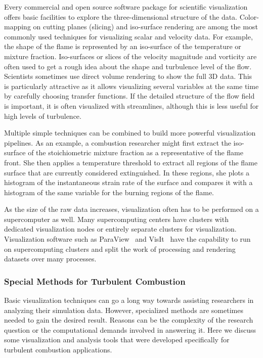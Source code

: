 %
Every commercial and open source software package for scientific visualization
offers basic facilities to explore the three-dimensional structure of the data.
%
Color-mapping on cutting planes (slicing) and iso-surface rendering are among
the most commonly used techniques for visualizing scalar and velocity data.
%
For example, the shape of the flame is represented by an iso-surface of the
temperature or mixture fraction.
%
Iso-surfaces or slices of the velocity magnitude and vorticity are often used to
get a rough idea about the shape and turbulence level of the flow.
%
Scientists sometimes use direct volume rendering to show the full \ac{3D} data.
%
This is particularly attractive as it allows visualizing several variables at
the same time by carefully choosing transfer functions.
%
If the detailed structure of the flow field is important, it is often visualized
with streamlines, although this is less useful for high levels of turbulence.
%

%
Multiple simple techniques can be combined to build more powerful visualization
pipelines.
%
As an example, a combustion researcher might first extract the iso-surface of
the stoichiometric mixture fraction as a representative of the flame front.
%
She then applies a temperature threshold to extract all regions of the flame
surface that are currently considered extinguished.
%
In these regions, she plots a histogram of the instantaneous strain rate of the
surface and compares it with a histogram of the same variable for the burning
regions of the flame.
%

%
As the size of the raw data increases, visualization often has to be performed
on a supercomputer as well.
%
Many supercomputing centers have clusters with dedicated visualization nodes or
entirely separate clusters for visualization.
%
Visualization software such as ParaView~\cite{Ahrens2005} and
VisIt~\cite{HPV:VisIt} have the capability to run on supercomputing clusters
and split the work of processing and rendering datasets over many processes.
%
%
\subsubsection{Special Methods for Turbulent Combustion} %
\label{ssub:special_methods_for_turbulent_combustion}
%
Basic visualization techniques can go a long way towards assisting researchers
in analyzing their simulation data.
%
However, specialized methods are sometimes needed to gain the desired result.
%
Reasons can be the complexity of the research question or the computational
demands involved in answering it.
%
Here we discuss some visualization and analysis tools that were developed
specifically for turbulent combustion applications.
%

